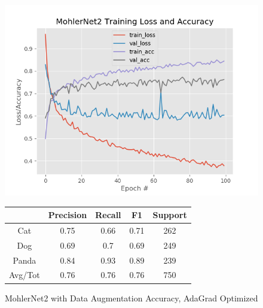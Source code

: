 \documentclass[12pt]{article}
\begin{document}
\begin{figure}[h]
	\centering %
	\captionsetup{justification=centering}
	\begin{minipage}{0.5\textwidth}
		\centering %
		\includegraphics[width=1\textwidth]{MohlerNet2_opt-AdaGradAugment_KEEP.png}
		\caption{MohlerNet2 with Data Augmentation Accuracy, AdaGrad Optimized} \label{MN2Aug}
	\end{minipage}\hfill
	\begin{minipage}{0.5\textwidth}
		\begin{center}
			\begin{tabular}[5pt]{| c| c| c| c|c|}
				\hline
				& Precision & Recall & F1 & Support \\[0.5ex] 
				\hline 	
				Cat   &    0.75&	0.66&	0.71&	262\\ \hline 
				Dog    &   0.69&	0.7&	0.69&	249\\ \hline 
				Panda   &   0.84&	0.93&	0.89&	239\\ \hline 
				Avg/Tot  &    0.76&	0.76&	0.76&	750\\ \hline 
				
			\end{tabular}
			\label{MN2RAug}
		\end{center}	
	\end{minipage}
\end{figure}
\end{document}
